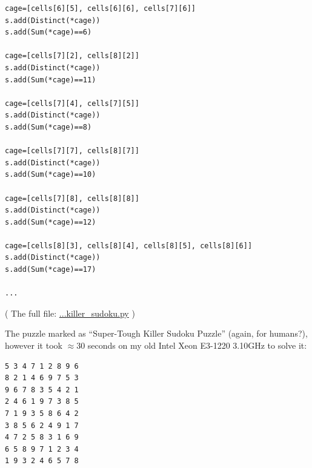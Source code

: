\begin{lstlisting}
cage=[cells[6][5], cells[6][6], cells[7][6]]
s.add(Distinct(*cage))
s.add(Sum(*cage)==6)

cage=[cells[7][2], cells[8][2]]
s.add(Distinct(*cage))
s.add(Sum(*cage)==11)

cage=[cells[7][4], cells[7][5]]
s.add(Distinct(*cage))
s.add(Sum(*cage)==8)

cage=[cells[7][7], cells[8][7]]
s.add(Distinct(*cage))
s.add(Sum(*cage)==10)

cage=[cells[7][8], cells[8][8]]
s.add(Distinct(*cage))
s.add(Sum(*cage)==12)

cage=[cells[8][3], cells[8][4], cells[8][5], cells[8][6]]
s.add(Distinct(*cage))
s.add(Sum(*cage)==17)

...
\end{lstlisting}

( The full file: \url{...killer_sudoku.py} )

The puzzle marked as ``Super-Tough Killer Sudoku Puzzle'' (again, for humans?),
however it took $\approx 30$ seconds on my old Intel Xeon E3-1220 3.10GHz to solve it:

\begin{lstlisting}
5 3 4 7 1 2 8 9 6
8 2 1 4 6 9 7 5 3
9 6 7 8 3 5 4 2 1
2 4 6 1 9 7 3 8 5
7 1 9 3 5 8 6 4 2
3 8 5 6 2 4 9 1 7
4 7 2 5 8 3 1 6 9
6 5 8 9 7 1 2 3 4
1 9 3 2 4 6 5 7 8
\end{lstlisting}

